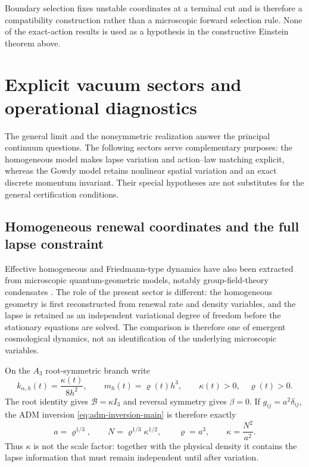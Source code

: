 \documentclass[11pt]{article}
\numberwithin{equation}{section}
\theoremstyle{definition}
\theoremstyle{remark}
\begin{document}
Boundary selection fixes unstable coordinates at a terminal cut and is
therefore a compatibility construction rather than a microscopic forward
selection rule.  None of the exact-action results is used as a hypothesis in
the constructive Einstein theorem above.


\section{Explicit vacuum sectors and operational diagnostics}
\label{sec:vacuum-main}

The general limit and the nonsymmetric realization answer the principal
continuum questions. The following sectors serve complementary purposes:
the homogeneous model makes lapse variation and action--law matching
explicit, whereas the Gowdy model retains nonlinear spatial variation and
an exact discrete momentum invariant. Their special hypotheses are not
substitutes for the general certification conditions.
\subsection{Homogeneous renewal coordinates and the full lapse constraint}
\label{subsec:homogeneous-renewal-main}

Effective homogeneous and Friedmann-type dynamics have also been extracted
from microscopic quantum-geometric models, notably group-field-theory
condensates \cite{GielenOritiSindoni2013,GielenSindoni2016}.  The role of the
present sector is different: the homogeneous geometry is first reconstructed
from renewal rate and density variables, and the lapse is retained as an
independent variational degree of freedom before the stationary equations are
solved.  The comparison is therefore one of emergent cosmological dynamics,
not an identification of the underlying microscopic variables.

On the $A_3$ root-symmetric branch write
\begin{equation}
 k_{\alpha,h}(t)=\frac{\kappa(t)}{8h^2},
 \qquad
 m_h(t)=\varrho(t)h^3,
 \qquad \kappa(t)>0,\quad\varrho(t)>0.
 \label{eq:main-general-homogeneous-rates}
\end{equation}
The root identity gives $\mathcal B=\kappa I_3$ and reversal symmetry gives
$\beta=0$.  If $g_{ij}=a^2\delta_{ij}$, the ADM inversion
\eqref{eq:adm-inversion-main} is therefore exactly
\begin{equation}
 a=\varrho^{1/3},\qquad
 N=\varrho^{1/3}\kappa^{1/2},\qquad
 \varrho=a^3,\qquad
 \kappa=\frac{N^2}{a^2}.
 \label{eq:main-isotropic-renewal-map}
\end{equation}
Thus $\kappa$ is not the scale factor: together with the physical density it
contains the lapse information that must remain independent until after
variation.
\end{document}
